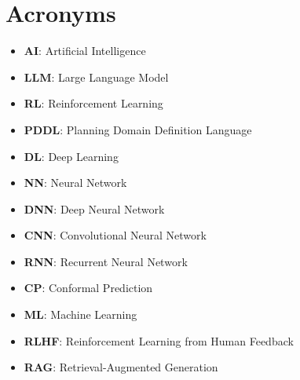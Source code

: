 \chapter{Acronyms}
\label{apx:acronyms}
\begin{itemize}
  \item \textbf{AI}: Artificial Intelligence

  \item \textbf{LLM}: Large Language Model

  \item \textbf{RL}: Reinforcement Learning

  \item \textbf{PDDL}: Planning Domain Definition Language

  \item \textbf{DL}: Deep Learning

  \item \textbf{NN}: Neural Network

  \item \textbf{DNN}: Deep Neural Network

  \item \textbf{CNN}: Convolutional Neural Network

  \item \textbf{RNN}: Recurrent Neural Network

  \item \textbf{CP}: Conformal Prediction

  \item \textbf{ML}: Machine Learning

  \item \textbf{RLHF}: Reinforcement Learning from Human Feedback

  \item \textbf{RAG}: Retrieval-Augmented Generation
\end{itemize}